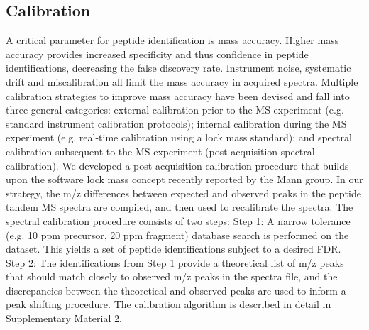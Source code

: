 \documentclass[journal=jprobs,manuscript=article]{achemso}
\begin{document}
\subsection{Calibration}

A critical parameter for peptide identification is mass accuracy\citep{Scherl_2008}.
Higher mass accuracy provides increased specificity and thus confidence in peptide identifications, decreasing the false discovery rate.
Instrument noise, systematic drift and miscalibration all limit the mass accuracy in acquired spectra.
Multiple calibration strategies to improve mass accuracy have been devised and fall into three general categories: external calibration prior to the MS experiment (e.g. standard instrument calibration protocols); internal calibration during the MS experiment (e.g. real-time calibration using a lock mass standard\citep{Olsen_2005}); and spectral calibration subsequent to the MS experiment (post-acquisition spectral calibration).
We developed a post-acquisition calibration procedure that builds upon the software lock mass concept\citep{Cox_2011} recently reported by the Mann group.
In our strategy, the m/z differences between expected and observed peaks in the peptide tandem MS spectra are compiled, and then used to recalibrate the spectra.
The spectral calibration procedure consists of two steps: Step 1: A narrow tolerance (e.g. 10 ppm precursor, 20 ppm fragment) database search is performed on the dataset.
This yields a set of peptide identifications subject to a desired FDR.
Step 2: The identifications from Step 1 provide a theoretical list of m/z peaks that should match closely to observed m/z peaks in the spectra file, and the discrepancies between the theoretical and observed peaks are used to inform a peak shifting procedure.
The calibration algorithm is described in detail in Supplementary Material 2.
\end{document}
